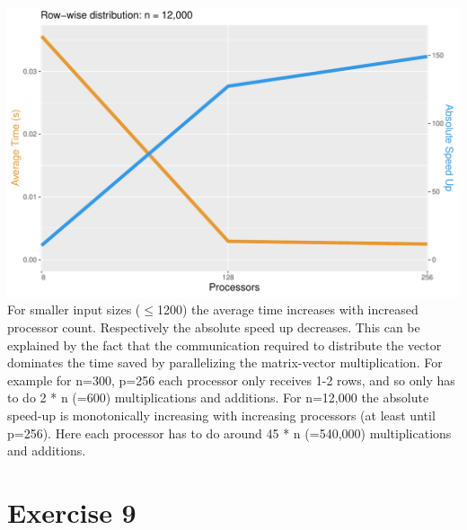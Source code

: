 \documentclass[a4paper,%
11pt,%
DIV=12,
headsepline,%
headings=normal,
]{scrartcl}
\newcounter{curex}
\newcommand{\exercise}[1]{\section*{Exercise #1}\setcounter{curex}{#1}}
\begin{document}
\includegraphics[scale=0.4,page=1]{../plots/matrix_vector_plot_Row-wise-distribution_12000} \\

For smaller input sizes ($\leq$1200) the average time increases with increased processor count. Respectively the absolute speed up decreases. This can be explained by the fact that the communication required to distribute the vector dominates the time saved by parallelizing the matrix-vector multiplication. For example for n=300, p=256 each processor only receives 1-2 rows, and so only has to do 2 * n (=600) multiplications and additions. For n=12,000 the absolute speed-up is monotonically increasing with increasing processors (at least until p=256). Here each processor has to do around 45 * n (=540,000) multiplications and additions.

\exercise{9}
\end{document}
